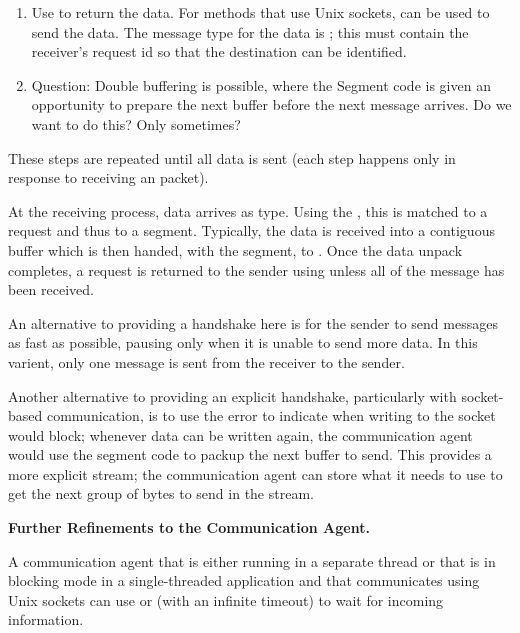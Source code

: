 \begin{mmadi}
\begin{tcp}
\begin{enumerate}
\item Use  to return the data.  For methods that use Unix
  sockets,  can be used to send the data.  The
  message type for the data is ; this must contain
  the receiver's request id so that the destination can be identified.

\item Question:  Double buffering is possible, where the Segment code is given
  an opportunity to prepare the next buffer before the next
   message arrives.  Do we want to do this?
  Only sometimes?

\end{enumerate}
These steps are repeated until all data is sent (each step happens only in
response to receiving an  packet).

At the receiving process, data arrives as  type.  
Using the , this is matched to a request
and thus to a segment.  Typically, the data is received into a contiguous
buffer which is then handed, with the segment, to .
Once the data unpack completes, a  request is
returned to the sender using  unless all of the message
has been received.

An alternative to providing a handshake here is for the sender to send
 messages as fast as possible, pausing only when it
is unable to send more data.  In this varient, only one
 message is sent from the receiver to the
sender. 

Another alternative to providing an explicit handshake, particularly with
socket-based communication, is to use the  error to indicate when
writing to the socket would block; whenever data can be written again, the
communication agent would use the segment code to packup the next buffer to
send.  This provides a more explicit stream; the communication agent can store
what it needs to use to get the next group of bytes to send in the stream.

\textbf{Further Refinements to the Communication Agent.}

A communication agent that is either running in a separate thread or that is
in blocking mode in a single-threaded application and that communicates using
Unix sockets can use  or  (with an infinite timeout)
to wait for incoming information.


\end{tcp}
\end{mmadi}
